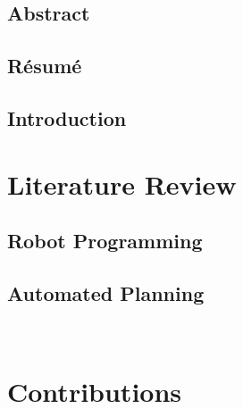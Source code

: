 \documentclass[a4paper,12pt,twoside,openany]{book}
\theoremstyle{definition}
\theoremstyle{remark}
\begin{document}
%


%

\cleardoublepage
\chapter*{Abstract}


\chapter*{R\'{e}sum\'{e}}

%

\dominitoc%
\tableofcontents
\listoffigures


\chapter{Introduction} \label{chap:Intro}
\minitoc%

\part{Literature Review}\label{part1}
 \cleardoublepage
\chapter{Robot Programming}\label{chap:Sota}
\minitoc%


\cleardoublepage
\chapter{Automated Planning}\label{chap:Sota-AP}
\minitoc%
\

\cleardoublepage
\part{Contributions}\label{part2}
\cleardoublepage
\end{document}
